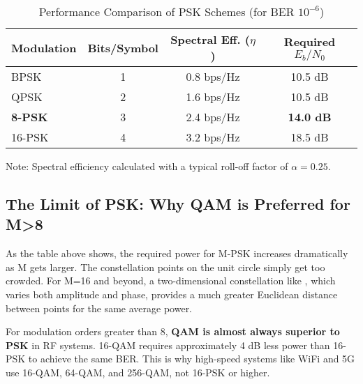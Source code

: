 \begin{table}[H]
    \centering
    \caption{Performance Comparison of PSK Schemes (for BER $10^{-6}$)}
    \label{tab:psk-comparison}
    \begin{tabular}{@{}lccc@{}}
        \toprule
        \tableheaderfont Modulation & \tableheaderfont Bits/Symbol & \tableheaderfont Spectral Eff. ($\eta$) & \tableheaderfont Required $E_b/N_0$ \\
        \midrule
        BPSK & 1 & 0.8 bps/Hz & 10.5 dB \\
        QPSK & 2 & 1.6 bps/Hz & 10.5 dB \\
        \textbf{8-PSK} & 3 & 2.4 bps/Hz & \textbf{14.0 dB} \\
        16-PSK & 4 & 3.2 bps/Hz & 18.5 dB \\
        \bottomrule
    \end{tabular}
    \par\vspace{0.5em}
    \small Note: Spectral efficiency calculated with a typical roll-off factor of $\alpha=0.25$.
\end{table}


\subsection{The Limit of PSK: Why QAM is Preferred for M>8}

As the table above shows, the required power for M-PSK increases dramatically as M gets larger. The constellation points on the unit circle simply get too crowded. For M=16 and beyond, a two-dimensional constellation like , which varies both amplitude and phase, provides a much greater Euclidean distance between points for the same average power.
\begin{warningbox}
    For modulation orders greater than 8, \textbf{QAM is almost always superior to PSK} in RF systems. 16-QAM requires approximately 4 dB less power than 16-PSK to achieve the same BER. This is why high-speed systems like WiFi and 5G use 16-QAM, 64-QAM, and 256-QAM, not 16-PSK or higher.
\end{warningbox}


